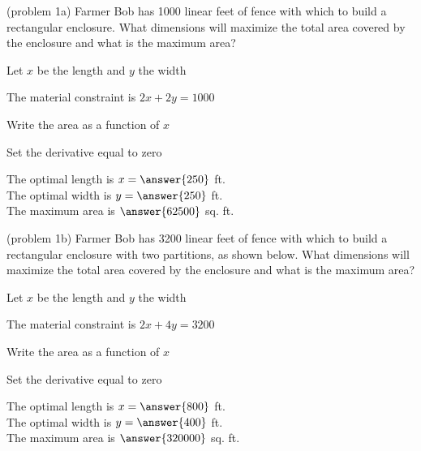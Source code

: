 \documentclass{ximera}
\begin{document}
\begin{problem}(problem 1a)
Farmer Bob has 1000 linear feet of fence with which to build a rectangular enclosure.  
What dimensions will maximize the total area covered by the enclosure and what is the maximum area?

\begin{hint}
Let $x$ be the length and $y$ the width
\end{hint}
\begin{hint}
The material constraint is $2x+2y = 1000$
\end{hint}
\begin{hint}
Write the area as a function of $x$
\end{hint}
\begin{hint}
Set the derivative equal to zero
\end{hint}

The optimal length is $x= \answer{250}$ ft.\\
The optimal width is $y = \answer{250}$ ft.\\
The maximum area is $\answer{62500}$ sq. ft.


\end{problem}


\begin{problem}(problem 1b)
Farmer Bob has 3200 linear feet of fence with which to build a rectangular enclosure with two partitions, as shown below.
What dimensions will maximize the total area covered by the enclosure and what is the maximum area?

\begin{center}
\end{center}
\begin{hint}
Let $x$ be the length and $y$ the width
\end{hint}
\begin{hint}
The material constraint is $2x+4y = 3200$
\end{hint}
\begin{hint}
Write the area as a function of $x$
\end{hint}
\begin{hint}
Set the derivative equal to zero
\end{hint}

The optimal length is $x= \answer{800}$ ft.\\
The optimal width is $y = \answer{400}$ ft.\\
The maximum area is $\answer{320000}$ sq. ft.
 
\end{problem}
\end{document}
